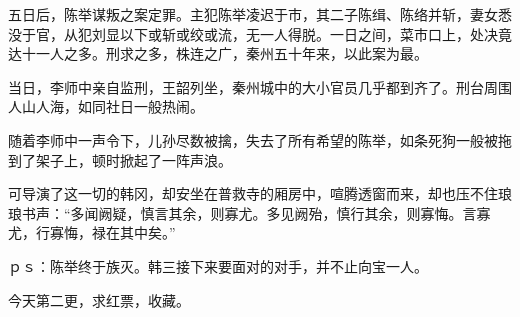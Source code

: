 五日后，陈举谋叛之案定罪。主犯陈举凌迟于市，其二子陈缉、陈络并斩，妻女悉没于官，从犯刘显以下或斩或绞或流，无一人得脱。一日之间，菜市口上，处决竟达十一人之多。刑求之多，株连之广，秦州五十年来，以此案为最。

当日，李师中亲自监刑，王韶列坐，秦州城中的大小官员几乎都到齐了。刑台周围人山人海，如同社日一般热闹。

随着李师中一声令下，儿孙尽数被擒，失去了所有希望的陈举，如条死狗一般被拖到了架子上，顿时掀起了一阵声浪。

可导演了这一切的韩冈，却安坐在普救寺的厢房中，喧腾透窗而来，却也压不住琅琅书声：“多闻阙疑，慎言其余，则寡尤。多见阙殆，慎行其余，则寡悔。言寡尤，行寡悔，禄在其中矣。”

ｐｓ：陈举终于族灭。韩三接下来要面对的对手，并不止向宝一人。

今天第二更，求红票，收藏。

